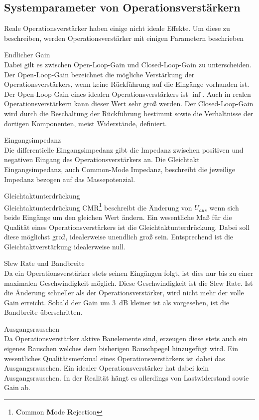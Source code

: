 \subsection{Systemparameter von Operationsverstärkern}
Reale Operationsverstärker haben einige nicht ideale Effekte. Um diese zu beschreiben, werden Operationsverstärker mit einigen Parametern beschrieben
\begin{description}
\item Endlicher Gain \\
Dabei gilt es zwischen Open-Loop-Gain und Closed-Loop-Gain zu unterscheiden. Der Open-Loop-Gain bezeichnet die mögliche Verstärkung der Operationsverstärkers, wenn keine Rückführung auf die Eingänge vorhanden ist. Der Open-Loop-Gain eines idealen Operationsverstärkers ist $\inf$. Auch in realen Operationsverstärkern kann dieser Wert sehr groß werden. Der Closed-Loop-Gain wird durch die Beschaltung der Rückführung bestimmt sowie die Verhältnisse der dortigen Komponenten, meist Widerstände, definiert.
\item Eingangsimpedanz \\
Die differentielle Eingangsimpedanz gibt die Impedanz zwischen positiven und  negativen Eingang des Operationsverstärkers an. Die Gleichtakt Eingangsimpedanz, auch Common-Mode Impedanz, beschreibt die jeweilige Impedanz bezogen auf das Massepotenzial.
\item Gleichtaktunterdrückung \\
Gleichtaktunterdrückung CMR\footnote{ \textbf{C}ommon \textbf{M}ode \textbf{R}ejection} beschreibt die Änderung von $U_{aus}$ wenn sich beide Eingänge um den gleichen Wert ändern. Ein wesentliche Maß für die Qualität eines Operationsverstärkers ist die Gleichtaktunterdrückung. Dabei soll diese möglichst groß, idealerweise unendlich groß sein. Entsprechend ist die Gleichtaktverstärkung idealerweise null. 
\item Slew Rate und Bandbreite \\
Da ein Operationsverstärker stets seinen Eingängen folgt, ist dies nur bis zu einer maximalen Geschwindigkeit möglich. Diese Geschwindigkeit ist die Slew Rate. Ist die Änderung schneller als der Operationsverstärker, wird nicht mehr der volle Gain erreicht. Sobald der Gain um \SI{3}{dB} kleiner ist als vorgesehen, ist die Bandbreite überschritten.
\item Ausgangsrauschen\\
Da Operationsverstärker aktive Bauelemente sind, erzeugen diese stets auch ein eigenes Rauschen welches dem bisherigen Rauschpegel hinzugefügt wird. Ein wesentliches Qualitätsmerkmal eines Operationsverstärkers ist dabei das Ausgangsrauschen. Ein idealer Operationsverstärker hat dabei kein Ausgangsrauschen. In der Realität hängt es allerdings von Lastwiderstand sowie Gain ab. 

\end{description}
